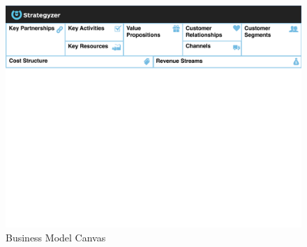 		\begin{figure}[!htb]
		    \begin{center}
			    \includegraphics[scale=0.6]{Talk11/bmc_blocks_only.pdf}
		    \end{center}
		    \caption{Business Model Canvas \cite{bmc}}
		    \label{fig:bmc}
		\end{figure}
